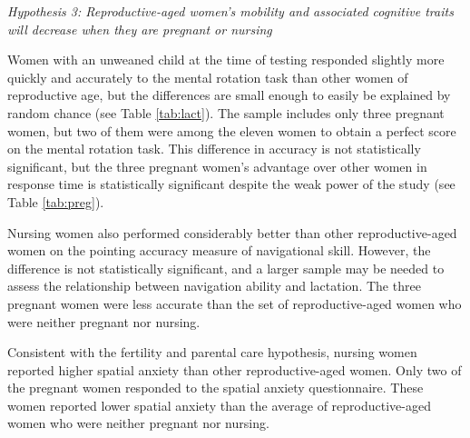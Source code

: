 \emph{Hypothesis 3:  Reproductive-aged women's mobility and associated cognitive traits will decrease when they are pregnant or nursing}
	\smallskip

Women with an unweaned child at the time of testing responded slightly more quickly and accurately to the mental rotation task than other women of reproductive age, but the differences are small enough to easily be explained by random chance (see Table \ref{tab:lact}).  The sample includes only three pregnant women, but two of them were among the eleven women to obtain a perfect score on the mental rotation task.  This difference in accuracy is not statistically significant, but the three pregnant women's advantage over other women in response time is statistically significant despite the weak power of the study (see Table \ref{tab:preg}).  

Nursing women also performed considerably better than other reproductive-aged women on the pointing accuracy measure of navigational skill.  However, the difference is not statistically significant, and a larger sample may be needed to assess the relationship between navigation ability and lactation.  The three pregnant women were less accurate than the set of reproductive-aged women who were neither pregnant nor nursing. 

Consistent with the fertility and parental care hypothesis, nursing women reported higher spatial anxiety than other reproductive-aged women.  Only two of the pregnant women responded to the spatial anxiety questionnaire.  These women reported lower spatial anxiety than the average of reproductive-aged women who were neither pregnant nor nursing.

